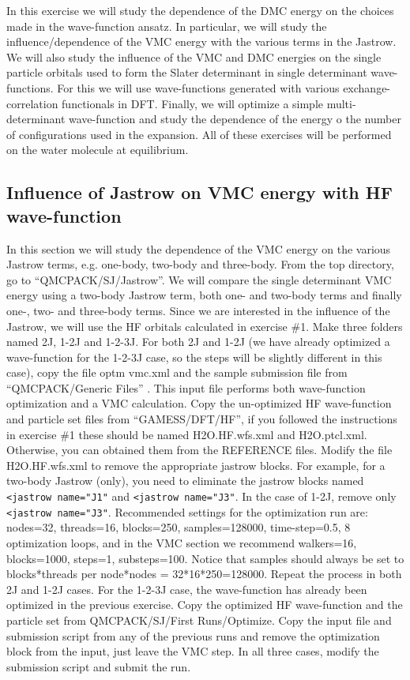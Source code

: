 In this exercise we will study the dependence of the DMC energy on the choices made
in the wave-function ansatz. In particular, we will study the influence/dependence of the
VMC energy with the various terms in the Jastrow. We will also study the influence of
the VMC and DMC energies on the single particle orbitals used to form the Slater determinant 
in single determinant wave-functions. For this we will use wave-functions generated
with various exchange-correlation functionals in DFT. Finally, we will optimize a simple
multi-determinant wave-function and study the dependence of the energy o the number of
configurations used in the expansion. All of these exercises will be performed on the water 
molecule at equilibrium.


\subsection{Influence of Jastrow on VMC energy with HF wave-function}
In this section we will study the dependence of the VMC energy on the various Jastrow
terms, e.g. one-body, two-body and three-body. From the top directory, go to ``QMCPACK/SJ/Jastrow''. 
We will compare the single determinant VMC energy using a two-body 
Jastrow term, both one- and two-body terms and finally one-, two- and three-body
terms. Since we are interested in the influence of the Jastrow, we will use the HF orbitals
calculated in exercise \#1. Make three folders named 2J, 1-2J and 1-2-3J. For both 2J and
1-2J (we have already optimized a wave-function for the 1-2-3J case, so the steps will be
slightly different in this case), copy the file optm vmc.xml and the sample submission file
from ``QMCPACK/Generic Files'' . This input file performs both wave-function optimization 
and a VMC calculation. Copy the un-optimized HF wave-function and particle set files
from ``GAMESS/DFT/HF'', if you followed the instructions in exercise \#1 these should be
named H2O.HF.wfs.xml and H2O.ptcl.xml. Otherwise, you can obtained them from the
REFERENCE files. Modify the file H2O.HF.wfs.xml to remove the appropriate jastrow
blocks. For example, for a two-body Jastrow (only), you need to eliminate the jastrow
blocks named \texttt{<jastrow name="J1"} and \texttt{<jastrow name="J3"}. In the case of 1-2J, remove
only \texttt{<jastrow name="J3"}. Recommended settings for the optimization run are: nodes=32,
threads=16, blocks=250, samples=128000, time-step=0.5, 8 optimization loops, and in the
VMC section we recommend walkers=16, blocks=1000, steps=1, substeps=100. Notice that
samples should always be set to blocks*threads per node*nodes = 32*16*250=128000. Repeat 
the process in both 2J and 1-2J cases. For the 1-2-3J case, the wave-function has
already been optimized in the previous exercise. Copy the optimized HF wave-function and
the particle set from QMCPACK/SJ/First Runs/Optimize. Copy the input file and submission 
script from any of the previous runs and remove the optimization block from the
input, just leave the VMC step. In all three cases, modify the submission script and submit
the run.

